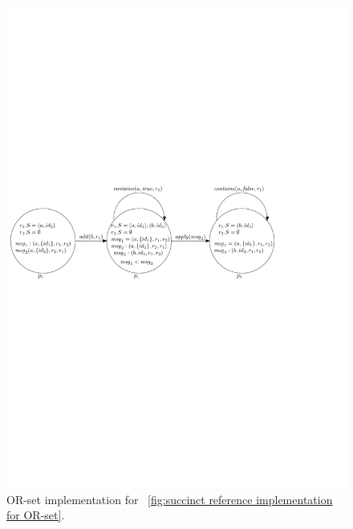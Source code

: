 \begin{figure}[t]
  \centering
  \includegraphics[width=0.8 \textwidth]{figures/PIC-OR-set-Implementation-Execution.pdf}
  \caption{OR-set implementation for \figurename~\ref{fig:succinct reference implementation for OR-set}.} 
  \label{fig:or-set implemtation for succinct or-set specification}
\end{figure}

